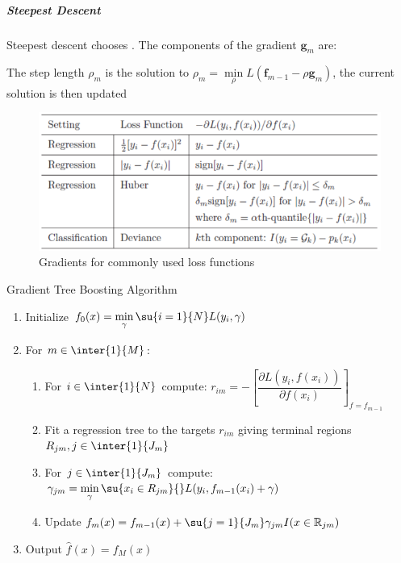 \subparagraph{Steepest Descent}
Steepest descent chooses . The components of the gradient $\bm{g}_{m}$ are: 
\begin{center}
\end{center}
The step length $\rho_{m}$ is the solution to 
$ \rho_{m}=\min\limits_{\rho}L\left(\bm{f}_{m-1}-\rho\bm{g}_{m}\right)$, the current solution
is then updated 
\begin{center}
\end{center}

\begin{figure}[H]
	\begin{center}
		\includegraphics[width=\textwidth]{./chap/1chap/7sec/images/5_common_gradients.PNG}
	\end{center}
	\caption{Gradients for commonly used loss functions}
	\label{fig:5_common_gradients}
\end{figure}

Gradient Tree Boosting Algorithm
\begin{enumerate}
	\item Initialize $f_{0}(x)=\min\limits_{\gamma}\su{{i=1}}{N}L(y_{i},\gamma)$
	\item For $m\in\inter{1}{M}$:
		\begin{enumerate}[label=(\alph*)]
			\item For $i\in\inter{1}{N}$ compute: $r_{im}=-\left[\dfrac{\partial L(y_{i},f(x_{i}))}{\partial f(x_{i})}\right]_{f=f_{m-1}}$
			\item  Fit a regression tree to the targets $r_{im}$ giving terminal 
				regions $R_{jm},j\in\inter{1}{J_{m}}$
			\item For $j\in\inter{1}{J_{m}}$ compute: $\gamma_{jm}=\min\limits_{
				\gamma}\su{{x_{i}}\in R_{jm}}{}L(y_{i},f_{m-1}(x_{i}) + \gamma)$
			\item Update $f_{m}(x)=f_{m-1}(x)+\su{{j=1}}{J_{m}}\gamma_{jm}I(x\in\mathbb{R}_{jm})$
		\end{enumerate}
	\item Output $\hat{f}(x)=f_{M}(x)$
\end{enumerate}

